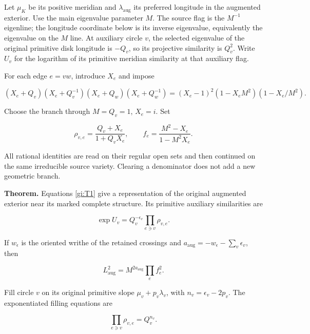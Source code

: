 Let \(\mu_K\) be its positive meridian and
\(\lambda_{\mathrm{aug}}\) its preferred longitude in the augmented
exterior. Use the main eigenvalue parameter \(M\). The source flag
is the \(M^{-1}\) eigenline; the longitude coordinate below is its
inverse eigenvalue, equivalently the eigenvalue on the \(M\) line.
At auxiliary circle \(v\), the selected eigenvalue of the original
primitive disk longitude is \(-Q_v\), so its projective similarity
is \(Q_v^2\). Write \(U_v\) for the logarithm of its primitive
meridian similarity at that auxiliary flag.

For each edge \(e=vw\), introduce \(X_e\) and impose

\begin{equation}\label{gi:T1}
(X_e+Q_v)(X_e+Q_v^{-1})(X_e+Q_w)(X_e+Q_w^{-1})
       =(X_e-1)^2(1-X_eM^2)(1-X_e/M^2).
\end{equation}

Choose the branch through \(M=Q_v=1\), \(X_e=i\). Set

\begin{equation}\label{gi:T2}
\rho_{v,e}=\frac{Q_v+X_e}{1+Q_vX_e},\qquad
 f_e=\frac{M^2-X_e}{1-M^2X_e}.
\end{equation}

All rational identities are read on their regular open sets and then
continued on the same irreducible source variety. Clearing a denominator
does not add a new geometric branch.

\textbf{Theorem.} Equations \eqref{gi:T1} give a representation of the original
augmented exterior near its marked complete structure. Its primitive
auxiliary similarities are

\begin{equation}\label{gi:T3}
\exp U_v=Q_v^{-\epsilon_v}
                                  \prod_{e\ni v}\rho_{v,e}.
\end{equation}

If \(w_\epsilon\) is the oriented writhe of the retained crossings and
\(a_{\mathrm{aug}}=-w_\epsilon-\sum_v\epsilon_v\), then

\begin{equation}\label{gi:T4}
L_{\mathrm{aug}}^2
                     =M^{2a_{\mathrm{aug}}}\prod_e f_e^2.
\end{equation}

Fill circle \(v\) on its original primitive slope
\(\mu_v+p_v\lambda_v\), with
\(n_v=\epsilon_v-2p_v\). The exponentiated filling equations are

\begin{equation}\label{gi:T5}
\prod_{e\ni v}\rho_{v,e}=Q_v^{n_v}.
\end{equation}


